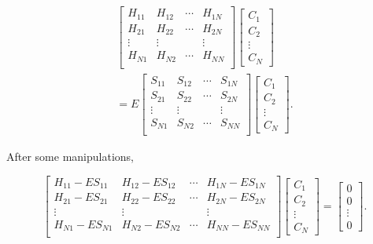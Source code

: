 \documentclass[a4paper, 12pt, titlepage,oneside,drop]{kthesis}
\begin{document}
\begin{equation}\begin{split}\label{ep4}
\left[
\begin{matrix}
    H_{11} & H_{12} & \cdots & H_{1N} \\
    H_{21} & H_{22} & \cdots & H_{2N} \\
    \vdots               & \vdots               &        & \vdots               \\
     H_{N1} & H_{N2} & \cdots & H_{NN} \\
\end{matrix} \right] \left[ \begin{array}{c} C_1 \\ C_2 \\ \vdots \\ C_N\end{array} \right] \\
=E \left[
\begin{matrix}
    S_{11} & S_{12} & \cdots & S_{1N} \\
    S_{21} & S_{22} & \cdots & S_{2N} \\
    \vdots               & \vdots               &        & \vdots               \\
     S_{N1} & S_{N2} & \cdots & S_{NN} \\
\end{matrix} \right]\left[ \begin{array}{c} C_1 \\ C_2 \\ \vdots \\ C_N\end{array} \right].
\end{split}\end{equation}

\noindent After some manipulations, 

\begin{equation}\label{ep44}
\left[
\begin{matrix}
    H_{11} - E S_{11} & H_{12} - E S_{12} & \cdots & H_{1N} - E S_{1N} \\
   H_{21} - E S_{21} & H_{22} - E S_{22} & \cdots & H_{2N} - E S_{2N} \\
    \vdots               & \vdots               &        & \vdots               \\
  H_{N1} - E S_{N1} & H_{N2} - E S_{N2} & \cdots & H_{NN} - E S_{NN} \\
\end{matrix} \right] \left[ \begin{array}{c} C_1 \\ C_2 \\ \vdots \\ C_N\end{array} \right]
=\left[ \begin{array}{c} 0 \\ 0 \\ \vdots \\ 0 \end{array} \right].
\end{equation}
\end{document}
